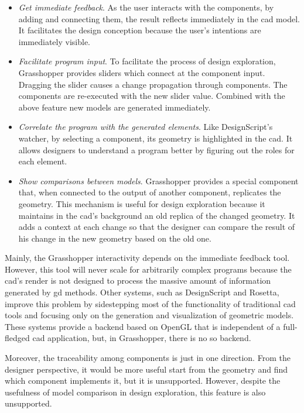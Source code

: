 \begin{itemize}
 \item \textit{Get immediate feedback}. As the user interacts with the components, by adding and connecting them, the result reflects immediately in the \gls{cad} model. It facilitates the design conception because the user's intentions are immediately visible. 
 \item \textit{Facilitate program input}. To facilitate the process of design exploration, Grasshopper provides sliders which connect at the component input. Dragging the slider causes a change propagation through components. The components are re-executed with the new slider value. Combined with the above feature new models are generated immediately.
 \item \textit{Correlate the program with the generated elements}. Like DesignScript's watcher, by selecting a component, its geometry is highlighted in the \gls{cad}. It allows designers to understand a program better by figuring out the roles for each element.
 \item \textit{Show comparisons between models}. Grasshopper provides a special component that, when connected to the output of another component, replicates the geometry. This mechanism is useful for design exploration because it maintains in the \gls{cad}'s background an old replica of the changed geometry. It adds a context at each change so that the designer can compare the result of his change in the new geometry based on the old one.
\end{itemize}

Mainly, the Grasshopper interactivity depends on the immediate feedback tool. However, this tool will never scale for arbitrarily complex programs because the \gls{cad}'s render is not designed to process the massive amount of information generated by \gls{gd} methods. Other systems, such as DesignScript and Rosetta, improve this problem by sidestepping most of the functionality of traditional \gls{cad} tools and focusing only on the generation and visualization of geometric models. These systems provide a backend based on OpenGL that is independent of a full-fledged \gls{cad} application, but, in Grasshopper, there is no so backend.

Moreover, the traceability among components is just in one direction. From the designer perspective, it would be more useful start from the geometry and find which component implements it, but it is unsupported. However, despite the usefulness of model comparison in design exploration, this feature is also unsupported.
